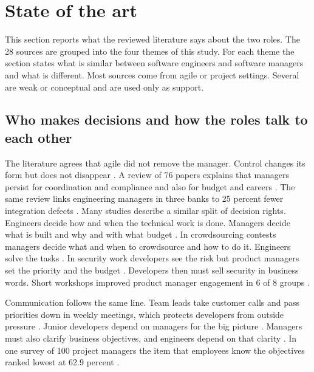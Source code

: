 \documentclass[conference]{IEEEtran}
\begin{document}
\section{State of the art}

This section reports what the reviewed literature says about the two roles. The 28 sources are grouped into the four themes of this study. For each theme the section states what is similar between software engineers and software managers and what is different. Most sources come from agile or project settings. Several are weak or conceptual and are used only as support.

\subsection{Who makes decisions and how the roles talk to each other}

The literature agrees that agile did not remove the manager. Control changes its form but does not disappear \cite{kalluri2025,kurt2024}. A review of 76 papers explains that managers persist for coordination and compliance and also for budget and careers \cite{kalluri2025}. The same review links engineering managers in three banks to 25 percent fewer integration defects \cite{kalluri2025}. Many studies describe a similar split of decision rights. Engineers decide how and when the technical work is done. Managers decide what is built and why and with what budget \cite{nguyen2016c,kurt2024,bibi2020,weir2023}. In crowdsourcing contests managers decide what and when to crowdsource and how to do it. Engineers solve the tasks \cite{bibi2020}. In security work developers see the risk but product managers set the priority and the budget \cite{weir2023}. Developers then must sell security in business words. Short workshops improved product manager engagement in 6 of 8 groups \cite{weir2023}.

Communication follows the same line. Team leads take customer calls and pass priorities down in weekly meetings, which protects developers from outside pressure \cite{knauss2018}. Junior developers depend on managers for the big picture \cite{knauss2018}. Managers must also clarify business objectives, and engineers depend on that clarity \cite{tarawneh2019}. In one survey of 100 project managers the item that employees know the objectives ranked lowest at 62.9 percent \cite{tarawneh2019}.
\end{document}
